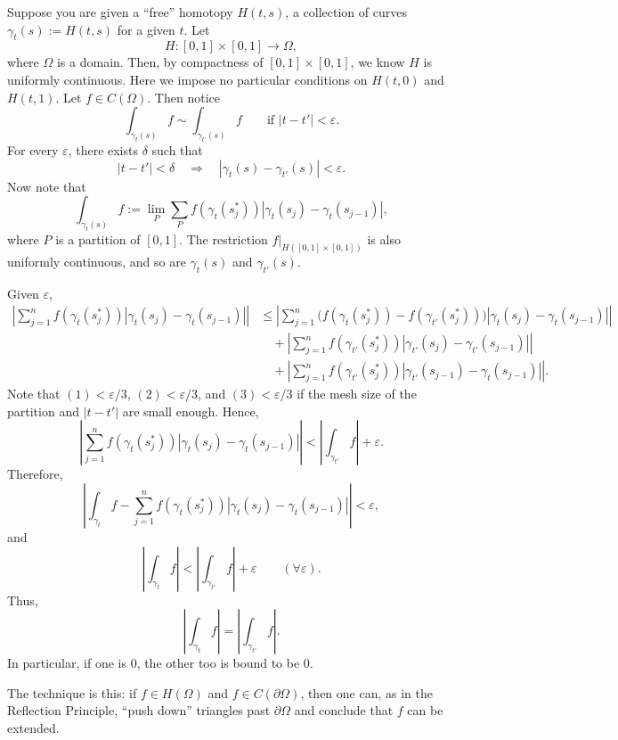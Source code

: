 \documentclass[11pt,a4paper]{article}
\begin{document}
Suppose you are given a ``free'' homotopy \(H(t,s)\), a collection of curves \(\gamma_t(s):=H(t,s)\) for a given \(t\). Let
\[
  H:[0,1]\times[0,1]\to\Omega,
\]
where \(\Omega\) is a domain. Then, by compactness of \([0,1]\times[0,1]\), we know \(H\) is uniformly continuous. Here we impose no particular conditions on \(H(t,0)\) and \(H(t,1)\). Let \(f\in C(\Omega)\). Then notice
\[
  \int_{\gamma_t(s)}f\sim\int_{\gamma_{t'}(s)}f
  \qquad\text{if }|t-t'|<\varepsilon.
\]
For every \(\varepsilon\), there exists \(\delta\) such that
\[
  |t-t'|<\delta
  \quad\Longrightarrow\quad
  |\gamma_t(s)-\gamma_{t'}(s)|<\varepsilon.
\]
Now note that
\[
  \int_{\gamma_t(s)}f
  :=\lim_{P}
  \sum_P f(\gamma_t(s_j^*))
  |\gamma_t(s_j)-\gamma_t(s_{j-1})|,
\]
where \(P\) is a partition of \([0,1]\). The restriction \(\left.f\right|_{H([0,1]\times[0,1])}\) is also uniformly continuous, and so are \(\gamma_t(s)\) and \(\gamma_{t'}(s)\).

Given \(\varepsilon\),
\begin{align*}
  \left|\sum_{j=1}^n f(\gamma_t(s_j^*))
  |\gamma_t(s_j)-\gamma_t(s_{j-1})|\right|
  &\le
  \left|\sum_{j=1}^n
    \bigl(f(\gamma_t(s_j^*))-f(\gamma_{t'}(s_j^*))\bigr)
    |\gamma_t(s_j)-\gamma_t(s_{j-1})|\right| \tag{1}\\
  &\quad+
  \left|\sum_{j=1}^n f(\gamma_{t'}(s_j^*))
    |\gamma_{t'}(s_j)-\gamma_{t'}(s_{j-1})|\right| \tag{2}\\
  &\quad+
  \left|\sum_{j=1}^n f(\gamma_{t'}(s_j^*))
    |\gamma_{t'}(s_{j-1})-\gamma_t(s_{j-1})|\right|. \tag{3}
\end{align*}
Note that \((1)<\varepsilon/3\), \((2)<\varepsilon/3\), and \((3)<\varepsilon/3\) if the mesh size of the partition and \(|t-t'|\) are small enough. Hence,
\[
  \left|\sum_{j=1}^n f(\gamma_t(s_j^*))
  |\gamma_t(s_j)-\gamma_t(s_{j-1})|\right|
  <\left|\int_{\gamma_{t'}}f\right|+\varepsilon.
\]
Therefore,
\[
  \left|\int_{\gamma_t}f-
  \sum_{j=1}^n f(\gamma_t(s_j^*))
  |\gamma_t(s_j)-\gamma_t(s_{j-1})|\right|<\varepsilon,
\]
and
\[
  \left|\int_{\gamma_t}f\right|
  <\left|\int_{\gamma_{t'}}f\right|+\varepsilon
  \qquad(\forall\varepsilon).
\]
Thus,
\[
  \left|\int_{\gamma_t}f\right|
  =\left|\int_{\gamma_{t'}}f\right|.
\]
In particular, if one is \(0\), the other too is bound to be \(0\).

The technique is this: if \(f\in H(\Omega)\) and \(f\in C(\partial\Omega)\), then one can, as in the Reflection Principle, ``push down'' triangles past \(\partial\Omega\) and conclude that \(f\) can be extended.
\end{document}
